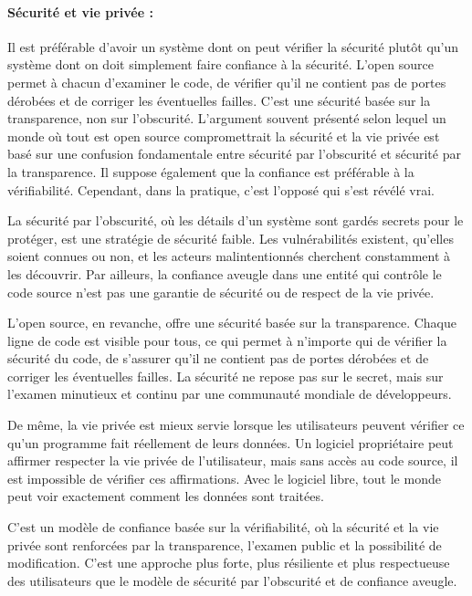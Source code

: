 \paragraph{Sécurité et vie privée :} Il est préférable d'avoir un système dont on peut vérifier la sécurité plutôt qu'un système dont on doit simplement faire confiance à la sécurité. L'open source permet à chacun d'examiner le code, de vérifier qu'il ne contient pas de portes dérobées et de corriger les éventuelles failles. C'est une sécurité basée sur la transparence, non sur l'obscurité.
L'argument souvent présenté selon lequel un monde où tout est open source compromettrait la sécurité et la vie privée est basé sur une confusion fondamentale entre sécurité par l'obscurité et sécurité par la transparence. Il suppose également que la confiance est préférable à la vérifiabilité. Cependant, dans la pratique, c'est l'opposé qui s'est révélé vrai.

La sécurité par l'obscurité, où les détails d'un système sont gardés secrets pour le protéger, est une stratégie de sécurité faible. Les vulnérabilités existent, qu'elles soient connues ou non, et les acteurs malintentionnés cherchent constamment à les découvrir. Par ailleurs, la confiance aveugle dans une entité qui contrôle le code source n'est pas une garantie de sécurité ou de respect de la vie privée.

L'open source, en revanche, offre une sécurité basée sur la transparence. Chaque ligne de code est visible pour tous, ce qui permet à n'importe qui de vérifier la sécurité du code, de s'assurer qu'il ne contient pas de portes dérobées et de corriger les éventuelles failles. La sécurité ne repose pas sur le secret, mais sur l'examen minutieux et continu par une communauté mondiale de développeurs.

De même, la vie privée est mieux servie lorsque les utilisateurs peuvent vérifier ce qu'un programme fait réellement de leurs données. Un logiciel propriétaire peut affirmer respecter la vie privée de l'utilisateur, mais sans accès au code source, il est impossible de vérifier ces affirmations. Avec le logiciel libre, tout le monde peut voir exactement comment les données sont traitées.

C'est un modèle de confiance basée sur la vérifiabilité, où la sécurité et la vie privée sont renforcées par la transparence, l'examen public et la possibilité de modification. C'est une approche plus forte, plus résiliente et plus respectueuse des utilisateurs que le modèle de sécurité par l'obscurité et de confiance aveugle.


